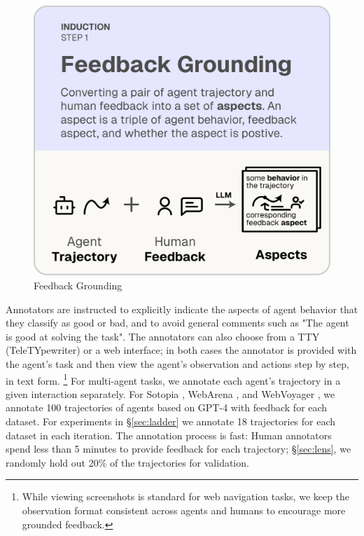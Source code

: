 \begin{figure}
  \vspace{-10pt}
  \includegraphics[width=\linewidth]{figs/autolibra_step_1.pdf}
  \vspace{-10pt}
  \caption{Feedback Grounding}
  \label{fig:feedback_grounding}
\end{figure}
Annotators are instructed to explicitly indicate the aspects of agent behavior that they classify as good or bad,
and to avoid general comments such as \textsf{"The agent is good at solving the task"}.
The annotators can also choose from a TTY (TeleTYpewriter) or a web interface; in both cases the annotator is provided with the agent's task
and then view the agent's observation and actions step by step, in text form. \footnote{While viewing screenshots is standard for web navigation tasks, we keep the observation format consistent across agents and humans to encourage more grounded feedback.}
For multi-agent tasks, we annotate each agent's trajectory in a given interaction separately. For Sotopia \citep{zhousotopia}, WebArena \citep{zhouwebarena},
and WebVoyager \citep{he2024webvoyager}, we annotate 100 trajectories of agents based on GPT-4 \citep{achiam2023gpt} with feedback for each dataset. For experiments in \S\ref{sec:ladder} we annotate 18 trajectories for each dataset in each
iteration. The annotation process is fast: Human annotators spend less than 5 minutes to provide feedback for each trajectory; \S\ref{sec:lens}, we randomly hold out 20\% of the trajectories for validation.

